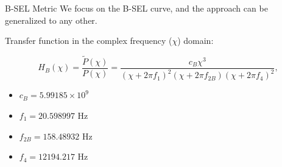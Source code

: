 \documentclass{beamer}
\newcounter{sectionframecount}
\begin{document}
\begin{frame}[t]{B-SEL Metric}
\vspace{-10pt}
We focus on the B-SEL curve, and the approach can be generalized to any other.

{
\vspace{7pt}
Transfer function in the complex frequency ($\chi$) domain:

\begin{equation}
  H_B(\chi) =\dfrac{\tilde{P}(\chi)}{P(\chi)} = \dfrac{c_B \chi^3}{(\chi+2\pi f_1)^2(\chi+2\pi f_{2B})(\chi+2\pi f_4)^2},
  \label{e:continuous_transfer}
\end{equation}
}

{
\vspace{10pt}
\begin{itemize}
  \item $c_B = 5.99185 \times 10^9$
  \item $f_1 = 20.598997$ Hz
  \item $f_{2B} = 158.48932$ Hz
  \item $f_4 = 12194.217$ Hz
\end{itemize}

}
\end{frame}

\end{document}
